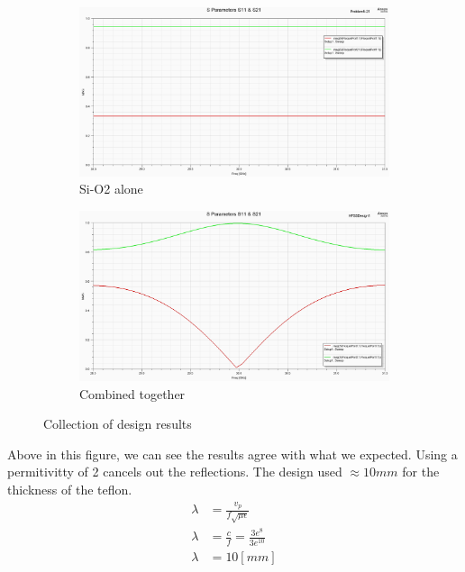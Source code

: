 \documentclass[12pt]{article}
\begin{document}
\begin{figure}[ht]
\begin{subfigure}[b]{0.45\textwidth}
  \centering
  \includegraphics[width=\textwidth]{./images/S11_21_Si-O2_alone.png} 
  \caption{Si-O2 alone}
  \label{fig:sio2}
\end{subfigure}
\hfill %
\begin{subfigure}[b]{0.45\textwidth}
  \centering
  \includegraphics[width=\textwidth]{./images/Go1_5-9_final.png}
  \caption{Combined together}
  \label{fig:both_materials}
\end{subfigure}

\caption{Collection of design results}
\label{fig:collection}
\end{figure}


\newpage
Above in this figure, we can see the results agree with what we expected. Using a permitivitty of 2 cancels out the reflections. The design used $\approx 10mm$ for the thickness of the teflon.
\begin{align*}
  \lambda &= \frac{v_p}{f\sqrt{\mu\epsilon}}\\
  \lambda &= \frac{c}{f} = \frac{3e^8}{3e^{10}}\\
  \lambda &= 10 [mm]
\end{align*}
\newpage
\end{document}
